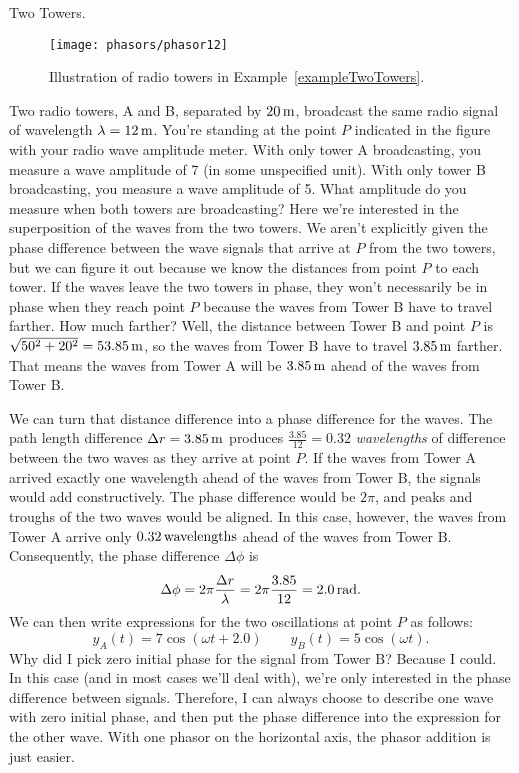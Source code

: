 \begin{exampleb}{Two Towers.} 
\label{exampleTwoTowers}
\begin{figure}\begin{center}
 \texttt{[image: phasors/phasor12]} 
\caption{\label{fig:phasor12}Illustration of radio towers in 
Example~\ref{exampleTwoTowers}.}
\end{center}
\end{figure}
Two radio towers, A and B, separated by $20\,\mbox{m}$,
broadcast the same radio signal of wavelength $\lambda =
12\,\mbox{m}$. You're standing at the point $P$ indicated in the
figure with your radio wave amplitude meter.
With only tower A broadcasting, you measure a wave amplitude
of 7 (in some unspecified unit).  With only tower B broadcasting, you
measure a wave amplitude of 5. What amplitude do you measure when both
towers are broadcasting?
\solution
Here we're interested in the superposition of the waves from the two
towers. We aren't explicitly given the phase difference between the
wave signals that arrive at $P$ from the two towers, but we can figure
it out because we know the distances from point $P$ to each tower. If
the waves leave the two towers in phase, they won't necessarily be in
phase when they reach point $P$ because the waves from Tower B have to
travel farther. How much farther? Well, the distance between Tower B
and point $P$ is $\sqrt{50^2 + 20^2} = 53.85\,\mbox{m}$, so the waves
from Tower B have to travel $3.85\,\mbox{m}$ farther. That means the
waves from Tower A will be $3.85\,\mbox{m}$ ahead of the waves from
Tower B.

We can turn that distance difference into a phase difference for the
waves. The path length difference $\Delta r = 3.85\,\mbox{m}$ produces
$\frac{3.85}{12} = 0.32$ {\em wavelengths} of difference between the two
waves as they arrive at point $P$.
If the waves from Tower A arrived exactly one wavelength ahead of the
waves from Tower B, the signals would add constructively. The phase
difference would be $2\pi$, and peaks and troughs of the two waves
would be aligned. In this case, however, the waves from Tower A arrive
only $0.32\,\mbox{wavelengths}$ ahead of the waves from Tower B.
Consequently, the phase difference $\Delta\phi$ is
\begin{equation}
\Delta\phi = 2\pi \frac{\Delta r}{\lambda} = 2\pi \frac{3.85}{12} 
= 2.0\,\mbox{rad}.
\end{equation} 
We can then write expressions for the two oscillations at point $P$ as
follows:
\begin{equation}
y_A(t) = 7\cos{\left(\omega t + 2.0\right)} \quad\quad
 y_B(t) = 5\cos{\left(\omega t\right)}.
\end{equation}
Why did I pick zero initial phase for the signal from Tower B?
Because I could. In this case (and in most cases we'll deal with),
we're only interested in the phase difference between signals.
Therefore, I can always choose to describe one wave with zero initial
phase, and then put the phase difference into the expression for the
other wave. With one phasor on the horizontal axis, the phasor
addition is just easier.


\end{exampleb}
